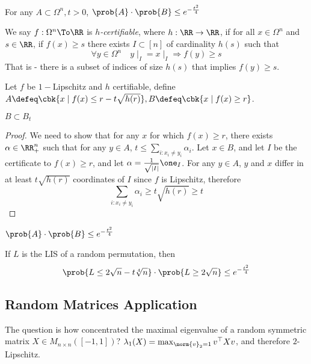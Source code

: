 \documentclass[a4paper, 11pt, oneside]{book}
\begin{document}
	\begin{thm}\label{thm: Talagrand}
		For any $A\subset \Omega^n, t>0$, $\prob{A}\cdot\prob{B} \le e^{-\frac{t^2}{4}}$
	\end{thm}
	\begin{yellowBox}
	\begin{defn}
		We say $f:\Omega^n\To \RR$ is \emph{$h$-certifiable}, where $h:\RR\to \RR$, if for all $x\in \Omega^n$ and $s\in \RR$, if $f(x)\ge s$ there exists $I\subset [n]$ of cardinality $h(s)$ such that
		\[
		\forall y\in \Omega^n\quad y\mid_I = x\mid_I \Rightarrow f(y)\ge s
		\]
		That is - there is a subset of indices of size $h(s)$ that implies $f(y)\ge s$.
	\end{defn}	
	\end{yellowBox}
	Let $f$ be $1-$Lipschitz and $h$ certifiable, define $A \defeq \cbk{x\mid f(x) \le r-t\sqrt{h(r)}}, B \defeq \cbk{x\mid f(x) \ge r}$.
\begin{claim}
	$B\subset B_t$
\end{claim}
\begin{proof}
	We need to show that for any $x$ for which $f(x)\ge r$, there exists $\alpha\in \RR^n_+$ such that for any $y\in A$, $t\le \sum_{i:x_i\neq y_i} \alpha_i $. Let $x\in B$, and let $I$ be the certificate to $f(x)\ge r$, and let $\alpha = \frac{1}{\sqrt{|I|}}\one_{I}$. For any $y\in A$, $y$ and $x$ differ in at least $t\sqrt{h(r)}$ coordinates of $I$ since $f$ is Lipschitz, therefore
	\[
	\sum_{i:x_i\ne y_i} \alpha_i \ge t\sqrt{h(r)}\ge t
	\]
\end{proof}
\begin{cor}
$\prob{A}\cdot\prob{B}	\le e^{-\frac{t^2}{4}}$
\end{cor}
\begin{cor}
If $L$ is the LIS of a random permutation, then	\[\prob{L\le 2\sqrt{n} - t\sqrt[4]{n}}\cdot \prob{L\ge 2\sqrt{n}}\le e^{-\frac{t^2}{4}}\]
\end{cor}

\subsection{Random Matrices Application}
The question is how concentrated the maximal eigenvalue of a random symmetric matrix $X\in M_{n\times n}([-1,1])$? $\lambda_1(X) = \max_{\norm{v}_2 = 1}v^\top X v$, and therefore $2$-Lipschitz.
\end{document}
